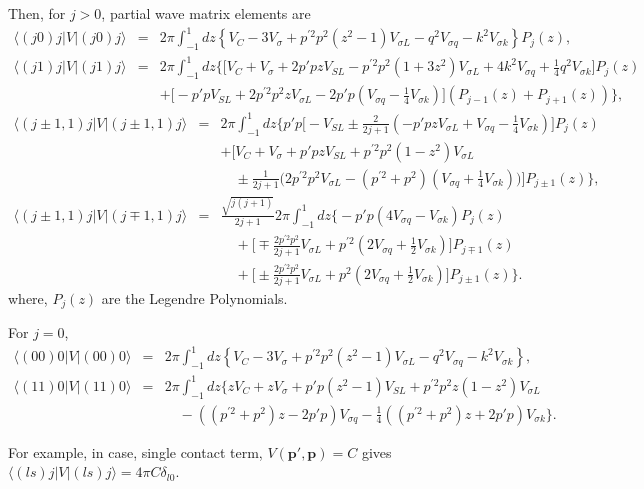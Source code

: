\documentclass[10pt]{article}
\def\bm{\boldsymbol}
\newcommand{\bea}{\begin{eqnarray}}
\newcommand{\eea}{\end{eqnarray}}
\newcommand{\no}{\nonumber \\}
\def\vp{{\bm p}}
\def\la{\langle}
\def\ra{\rangle}
\begin{document}
Then, for $j>0$, partial wave matrix elements are
\bea
\la (j 0) j|V|(j0)j\ra
&=& 2\pi \int_{-1}^{1}dz \left\{ 
 V_C-3 V_\sigma+ p^{'2}p^2(z^2-1)V_{\sigma L}
  -q^2 V_{\sigma q}-k^2 V_{\sigma k} 
\right\} P_j(z),\no 
\la (j1)j|V|(j1)j\ra
&=&2\pi\int_{-1}^{1}dz \Big\{ \Big[
  V_C+V_\sigma+2 p' p z V_{SL}
  -p^{'2}p^2(1+3z^2)V_{\sigma L}
  +4 k^2 V_{\sigma q}+\frac{1}{4}q^2 V_{\sigma k}
  \Big]  P_j(z)   \no & &
 +\Big[-p' p V_{SL}+2 p^{'2}p^2 z V_{\sigma L}
  -2 p' p(V_{\sigma q}-\frac{1}{4}V_{\sigma k}  )   
 \Big](P_{j-1}(z)+P_{j+1}(z))
\Big\},
\eea 
\bea
\la (j\pm 1,1)j|V|(j\pm 1,1) j\ra
&=& 2\pi \int_{-1}^1 dz \Big\{ 
    p' p \Big[ -V_{SL}
    \pm \frac{2}{2j+1}\left(-p'p z V_{\sigma L}
    +V_{\sigma q}-\frac{1}{4} V_{\sigma k}\right)\Big]P_j(z)
    \no & &
    +\Big[
     V_C+V_\sigma+p'pz V_{SL}+p^{'2}p^2(1-z^2)V_{\sigma L}
     \no & &\quad
     \pm\frac{1}{2j+1}
     \Big(2 p^{'2}p^2 V_{\sigma L}
     -(p^{'2}+p^2)\left(V_{\sigma q}+\frac{1}{4}V_{\sigma k}\right)
     \Big)
     \Big]P_{j\pm 1}(z)    
\Big\},\no
\la (j\pm 1,1)j|V|(j\mp 1,1)j\ra
&=&\frac{\sqrt{j(j+1)}}{2j+1} 2\pi\int_{-1}^1 dz\Big\{
    -p' p(4 V_{\sigma q}-V_{\sigma k})P_j(z) \no & &\quad
    +\Big[ \mp\frac{2 p^{'2}p^2}{2j+1}V_{\sigma L}
           +p^{'2}\left(2 V_{\sigma q}+\frac{1}{2}V_{\sigma k}\right)
    \Big] P_{j\mp 1}(z)\no & &\quad
   +\Big[\pm\frac{2 p^{'2}p^2}{2j+1}V_{\sigma L}
              +p^{2}\left(2 V_{\sigma q}+\frac{1}{2}V_{\sigma k}\right)
       \Big] P_{j\pm 1}(z)
\Big\}.
\eea
where, $P_j(z)$ are the Legendre Polynomials.

For $j=0$,
\bea
\la (00)0|V|(00)0\ra
&=& 2\pi\int_{-1}^1 dz\left\{
   V_C-3V_\sigma+p^{'2}p^2(z^2-1)V_{\sigma L}-q^2 V_{\sigma q}
   -k^2 V_{\sigma k}
\right\}, \no
\la (11)0|V|(11)0\ra
&=& 2\pi\int_{-1}^1 dz\Big\{
      z V_C+ z V_{\sigma}+p' p(z^2-1) V_{SL}
      +p^{'2}p^2 z(1-z^2) V_{\sigma L}
      \no & &\quad
      -((p^{'2}+p^2)z-2p'p)V_{\sigma q}
      -\frac{1}{4}((p^{'2}+p^2)z+2 p' p )V_{\sigma k}   
\Big\}.
\eea

For example, in case, single contact term,
$V(\vp',\vp)=C$ gives $\la (ls)j|V|(ls)j\ra=4\pi C \delta_{l0}$.
\end{document}
